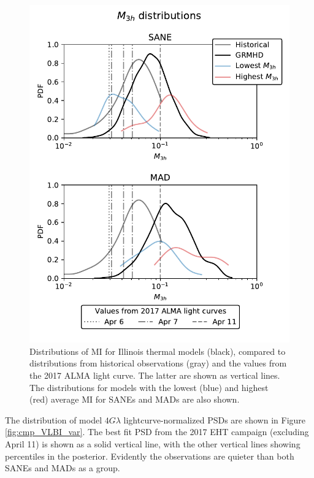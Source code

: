 \begin{figure}
  \centering
  \includegraphics[width=\columnwidth]{./figures/mi_dist.pdf}
  \caption{Distributions of MI for Illinois thermal models (black), compared to distributions from historical observations (gray) and the values from the 2017 ALMA light curve. The latter are shown as vertical lines. The distributions for models with the lowest (blue) and highest (red) average MI for SANEs and MADs are also shown. }
  \label{fig:cmp_ALMA_var}
\end{figure}


The distribution of model $4G\lambda$ lightcurve-normalized PSDs are shown in Figure \ref{fig:cmp_VLBI_var}.  The best fit PSD from the 2017 EHT campaign (excluding April 11) is shown as a solid vertical line, with the other vertical lines showing percentiles in the posterior.  Evidently the observations are quieter than both SANEs and MADs as a group.

